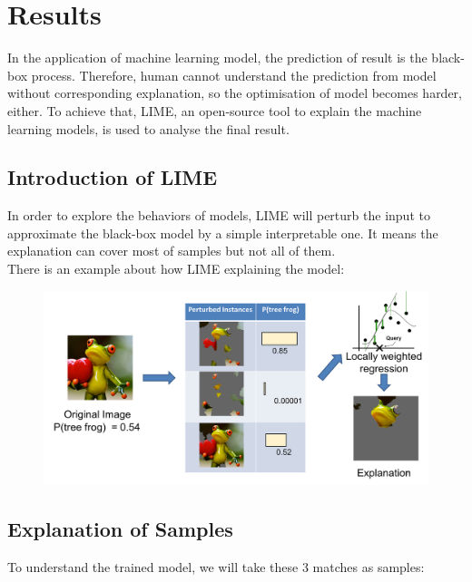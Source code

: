 \documentclass{article}
\begin{document}
\section{Results}

In the application of machine learning model, the prediction of result is the black-box process. Therefore, human cannot understand the prediction from model without corresponding explanation, so the optimisation of model becomes harder, either.
To achieve that, LIME, an open-source tool to explain the machine learning models, is used to analyse the final result. \\
\subsection{Introduction of LIME}
In order to explore the behaviors of models, LIME will perturb the input to approximate the black-box model by a simple interpretable one. It means the explanation can cover most of samples but not all of them.\\
There is an example about how LIME explaining the model:

\begin{figure}[ht]
\centering
\includegraphics[scale=0.4]{graphs/LIMEintro.png}
\caption{}
\label{fig:label}
\end{figure}

\subsection{Explanation of Samples}
To understand the trained model, we will take these 3 matches as samples:
\end{document}
